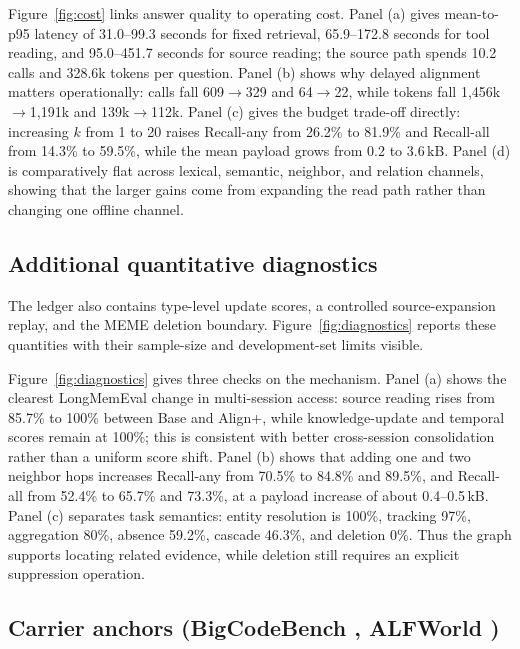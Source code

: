 Figure~\ref{fig:cost} links answer quality to operating cost. Panel (a) gives mean-to-p95 latency of 31.0--99.3 seconds for fixed retrieval, 65.9--172.8 seconds for tool reading, and 95.0--451.7 seconds for source reading; the source path spends 10.2 calls and 328.6k tokens per question. Panel (b) shows why delayed alignment matters operationally: calls fall 609$\to$329 and 64$\to$22, while tokens fall 1{,}456k$\to$1{,}191k and 139k$\to$112k. Panel (c) gives the budget trade-off directly: increasing $k$ from 1 to 20 raises Recall-any from 26.2\% to 81.9\% and Recall-all from 14.3\% to 59.5\%, while the mean payload grows from 0.2 to 3.6\,kB. Panel (d) is comparatively flat across lexical, semantic, neighbor, and relation channels, showing that the larger gains come from expanding the read path rather than changing one offline channel.

\subsection{Additional quantitative diagnostics}
\label{app:additional-diagnostics}

The ledger also contains type-level update scores, a controlled source-expansion replay, and the MEME deletion boundary. Figure~\ref{fig:diagnostics} reports these quantities with their sample-size and development-set limits visible.

\clearpage


Figure~\ref{fig:diagnostics} gives three checks on the mechanism. Panel (a) shows the clearest LongMemEval change in multi-session access: source reading rises from 85.7\% to 100\% between Base and Align+, while knowledge-update and temporal scores remain at 100\%; this is consistent with better cross-session consolidation rather than a uniform score shift. Panel (b) shows that adding one and two neighbor hops increases Recall-any from 70.5\% to 84.8\% and 89.5\%, and Recall-all from 52.4\% to 65.7\% and 73.3\%, at a payload increase of about 0.4--0.5\,kB. Panel (c) separates task semantics: entity resolution is 100\%, tracking 97\%, aggregation 80\%, absence 59.2\%, cascade 46.3\%, and deletion 0\%. Thus the graph supports locating related evidence, while deletion still requires an explicit suppression operation.

\subsection{Carrier anchors (BigCodeBench \citep{zhuo2024bigcodebench}, ALFWorld \citep{shridhar2021alfworld})}
\label{app:carrier-anchors}

